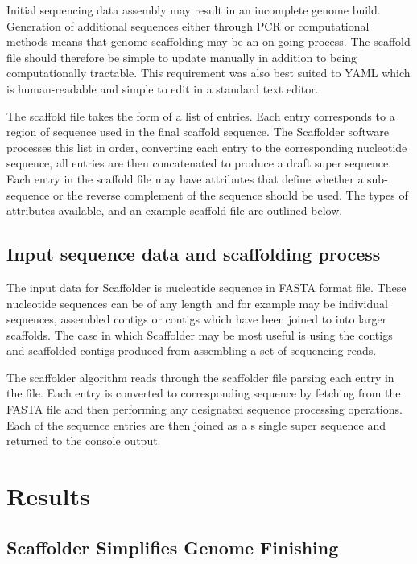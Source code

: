 \documentclass[10pt]{bmc_article}
\newenvironment{bmcformat}{\begin{raggedright}\baselineskip20pt\sloppy\setboolean{publ}{false}}{\end{raggedright}\baselineskip20pt\sloppy}
\begin{document}
\begin{bmcformat}
Initial sequencing data assembly may result in an incomplete genome build.
Generation of additional sequences either through PCR or computational methods
means that genome scaffolding may be an on-going process. The scaffold file
should therefore be simple to update manually in addition to being
computationally tractable. This requirement was also best suited to YAML which
is human-readable and simple to edit in a standard text editor. \pb

The scaffold file takes the form of a list of entries. Each entry corresponds
to a region of sequence used in the final scaffold sequence. The Scaffolder
software processes this list in order, converting each entry to the
corresponding nucleotide sequence, all entries are then concatenated to produce
a draft super sequence. Each entry in the scaffold file may have attributes
that define whether a sub-sequence or the reverse complement of the sequence
should be used. The types of attributes available, and an example scaffold file
are outlined below. \pb

\subsection*{Input sequence data and scaffolding process} %

The input data for Scaffolder is nucleotide sequence in FASTA format file.
These nucleotide sequences can be of any length and for example may be
individual sequences, assembled contigs or contigs which have been joined to
into larger scaffolds. The case in which Scaffolder may be most useful is using
the contigs and scaffolded contigs produced from assembling a set of sequencing
reads. \pb

The scaffolder algorithm reads through the scaffolder file parsing each entry
in the file. Each entry is converted to corresponding sequence by fetching from
the FASTA file and then performing any designated sequence processing
operations. Each of the sequence entries are then joined as a s single super
sequence and returned to the console output. \pb

\clearpage

\section*{Results} %

\subsection*{Scaffolder Simplifies Genome Finishing} %


\end{bmcformat}
\end{document}
